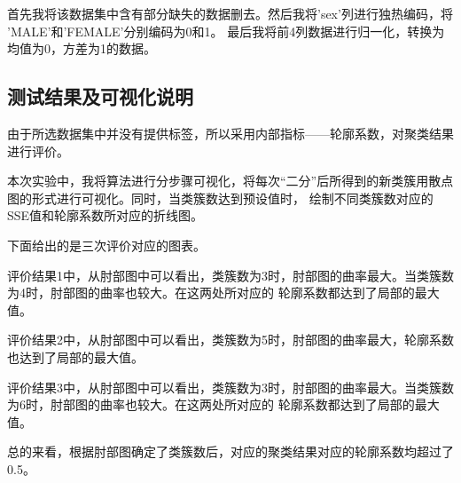 \documentclass[a4paper,11pt]{article}%
\theoremstyle{remark}
\theoremstyle{remark}
\theoremstyle{definition}
\theoremstyle{definition}
\theoremstyle{definition}
\begin{document}
首先我将该数据集中含有部分缺失的数据删去。然后我将'sex'列进行独热编码，将 'MALE'和'FEMALE'分别编码为0和1。
最后我将前4列数据进行归一化，转换为均值为0，方差为1的数据。
\subsection{测试结果及可视化说明}
由于所选数据集中并没有提供标签，所以采用内部指标——轮廓系数，对聚类结果进行评价。

本次实验中，我将算法进行分步骤可视化，将每次“二分”后所得到的新类簇用散点图的形式进行可视化。同时，当类簇数达到预设值时，
绘制不同类簇数对应的 SSE值和轮廓系数所对应的折线图。

下面给出的是三次评价对应的图表。

评价结果1中，从肘部图中可以看出，类簇数为3时，肘部图的曲率最大。当类簇数为4时，肘部图的曲率也较大。在这两处所对应的
轮廓系数都达到了局部的最大值。

评价结果2中，从肘部图中可以看出，类簇数为5时，肘部图的曲率最大，轮廓系数也达到了局部的最大值。

评价结果3中，从肘部图中可以看出，类簇数为3时，肘部图的曲率最大。当类簇数为6时，肘部图的曲率也较大。在这两处所对应的
轮廓系数都达到了局部的最大值。

总的来看，根据肘部图确定了类簇数后，对应的聚类结果对应的轮廓系数均超过了0.5。
\end{document}
